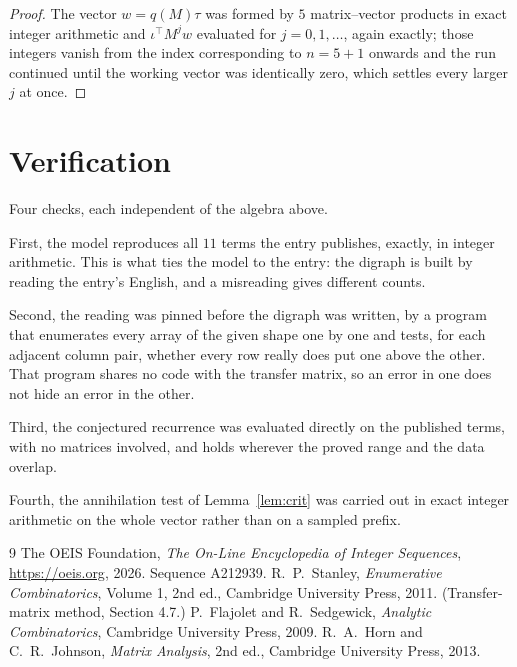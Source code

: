 \documentclass[11pt,a4paper]{article}
\theoremstyle{plain}
\theoremstyle{definition}
\begin{document}
\begin{proof}
The vector $w=q(M)\tau$ was formed by $5$ matrix--vector products in exact integer
arithmetic and $\iota^{\!\top}M^{j}w$ evaluated for $j=0,1,\dots$, again exactly; those
integers vanish from the index corresponding to $n=5+1$ onwards and the run continued
until the working vector was identically zero, which settles every larger $j$ at once.
\end{proof}

\section{Verification}

Four checks, each independent of the algebra above.

First, the model reproduces all $11$ terms the entry publishes, exactly, in integer
arithmetic. This is what ties the model to the entry: the digraph is built by reading the
entry's English, and a misreading gives different counts.

Second, the reading was pinned before the digraph was written, by a program that enumerates
every array of the given shape one by one and tests, for each adjacent column pair,
whether every row really does put one above the other. That program shares no code with the transfer matrix, so an error in one does not
hide an error in the other.

Third, the conjectured recurrence was evaluated directly on the published terms, with no
matrices involved, and holds wherever the proved range and the data overlap.

Fourth, the annihilation test of Lemma~\ref{lem:crit} was carried out in exact integer
arithmetic on the whole vector rather than on a sampled prefix.

\begin{thebibliography}{9}
 The OEIS Foundation, \emph{The On-Line Encyclopedia of Integer
Sequences}, \url{https://oeis.org}, 2026. Sequence A212939.
 R.~P.~Stanley, \emph{Enumerative Combinatorics}, Volume 1, 2nd ed.,
Cambridge University Press, 2011. (Transfer-matrix method, Section 4.7.)
 P.~Flajolet and R.~Sedgewick, \emph{Analytic Combinatorics}, Cambridge
University Press, 2009.
 R.~A.~Horn and C.~R.~Johnson, \emph{Matrix Analysis}, 2nd ed., Cambridge
University Press, 2013.
\end{thebibliography}
\end{document}
